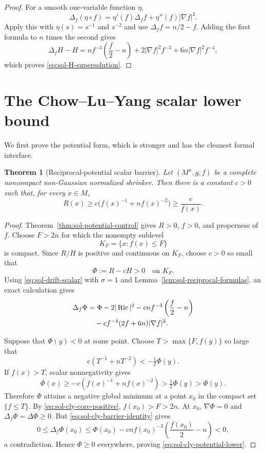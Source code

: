 \documentclass[10pt]{coll-l}
\newtheorem{theorem}{Theorem}[chapter]
\theoremstyle{definition}
\theoremstyle{remark}
\numberwithin{section}{chapter}
\numberwithin{equation}{chapter}
\newcommand{\Ric}{\operatorname{Ric}}
\begin{document}
\begin{proof}
For a smooth one-variable function $\eta$,
\[
 \Delta_f(\eta\circ f)
   =\eta'(f)\Delta_ff+\eta''(f)|\nabla f|^2.
\]
Apply this with $\eta(s)=s^{-1}$ and $s^{-2}$ and use
$\Delta_ff=n/2-f$.  Adding the first formula to $n$ times the second gives
\[
 \Delta_fH-H
   =nf^{-3}\left(\frac f2-n\right)
      +2|\nabla f|^2f^{-3}+6n|\nabla f|^2f^{-4},
\]
which proves \eqref{eq:sol-H-supersolution}.
\end{proof}

\section{The Chow--Lu--Yang scalar lower bound}
\label{sec:sol-cly}

We first prove the potential form, which is stronger and has the cleanest
formal interface.

\begin{theorem}[Reciprocal-potential scalar barrier]
\label{thm:sol-cly-potential}
Let $(M^n,g,f)$ be a complete noncompact non-Gaussian normalized shrinker.
Then there is a constant $c>0$ such that, for every $x\in M$,
\begin{equation}
 R(x)\geq c\bigl(f(x)^{-1}+nf(x)^{-2}\bigr)
       \geq\frac{c}{f(x)}.                               \label{eq:sol-cly-potential-lower}
\end{equation}
\end{theorem}

\begin{proof}
Theorem~\ref{thm:sol-potential-control} gives $R>0$, $f>0$, and properness
of $f$.  Choose $F>2n$ for which the nonempty sublevel
\[
                         K_F=\{x:f(x)\leq F\}
\]
is compact.  Since $R/H$ is positive and continuous on $K_F$, choose
$c>0$ so small that
\begin{equation}
                 \Phi:=R-cH>0\quad\text{on }K_F.          \label{eq:sol-cly-core-positive}
\end{equation}
Using \eqref{eq:sol-drift-scalar} with $\sigma=1$ and
Lemma~\ref{lem:sol-reciprocal-formulas}, an exact calculation gives
\begin{align}
 \Delta_f\Phi
 &=\Phi-2|\Ric|^2
   -cnf^{-3}\left(\frac f2-n\right)                      \label{eq:sol-cly-barrier-identity}\\
 &\quad
   -cf^{-4}(2f+6n)|\nabla f|^2.\notag
\end{align}

Suppose that $\Phi(y)<0$ at some point.  Choose
$T>\max\{F,f(y)\}$ so large that
\[
              c(T^{-1}+nT^{-2})<-\tfrac12\Phi(y).
\]
If $f(x)>T$, scalar nonnegativity gives
\[
 \Phi(x)\geq-c(f(x)^{-1}+nf(x)^{-2})
           >\tfrac12\Phi(y)>\Phi(y).
\]
Therefore $\Phi$ attains a negative global minimum at a point $x_0$ in the
compact set $\{f\leq T\}$.  By
\eqref{eq:sol-cly-core-positive}, $f(x_0)>F>2n$.  At $x_0$,
$\nabla\Phi=0$ and $\Delta_f\Phi=\Delta\Phi\geq0$.  But
\eqref{eq:sol-cly-barrier-identity} gives
\[
 0\leq\Delta_f\Phi(x_0)
  \leq\Phi(x_0)
    -cnf(x_0)^{-3}\left(\frac{f(x_0)}2-n\right)<0,
\]
a contradiction.  Hence $\Phi\geq0$ everywhere, proving
\eqref{eq:sol-cly-potential-lower}.
\end{proof}
\end{document}
